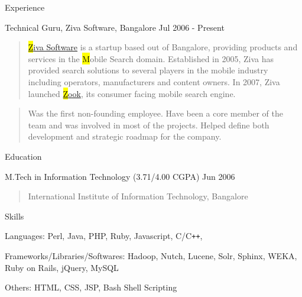 \documentclass{resume}
\author{Siddhartha Reddy Kothakapu}
\begin{document}
 \maketitle


\begin{category}{Experience}{}

    \item {\topic Technical Guru,} Ziva Software, Bangalore
        {\period Jul 2006 - Present}
        \begin{quote}
            \href{http://www.zook.in/}{{\hl Ziva Software}} is a 
            startup based out of Bangalore, providing products and services in the
            {\hl Mobile Search} domain.  Established in 2005, Ziva has
            provided search solutions to several players in the mobile industry
            including operators, manufacturers and content owners. In 2007, Ziva launched
            \href{http://www.zook.in/}{{\hl Zook}}, its consumer facing mobile
            search engine.
        \end{quote}
        \begin{quote}
            Was the first non-founding employee. Have been a core
            member of the team and was involved in most of the projects. Helped
            define both development and strategic roadmap for the company.
        \end{quote}

\end{category}


\begin{category}{Education}{}

    \item {\topic M.Tech in Information Technology}
        {\footnotesize(3.71/4.00 CGPA)}
        {\period Jun 2006}
        \begin{quote}
            International Institute of Information Technology, Bangalore
        \end{quote}

\end{category}


\begin{category}{Skills}{}

    \item {\topic Languages:} Perl, Java, PHP, Ruby, Javascript, C/C{\tt ++},

    \item {\topic Frameworks/Libraries/Softwares:} Hadoop, Nutch, Lucene, Solr,
        Sphinx, WEKA, Ruby on Rails, jQuery, MySQL

    \item {\topic Others:} HTML, CSS, JSP, Bash Shell Scripting

\end{category}
\end{document}
